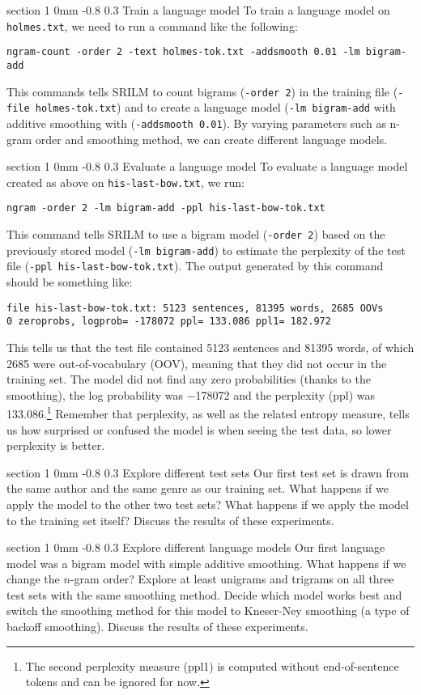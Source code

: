 \documentclass[11pt]{article}
\makeatletter
\newcommand{\newsec}[2]{\section{#1}\label{sec:#2}\noindent}
\renewcommand{\section}{\@startsection
{section}%
{1}%
{0mm}%
{-0.8\baselineskip}%
{0.3\baselineskip}%
{\bfseries\large}}%
\makeatother
\begin{document}
\newsec{Train a language model}{train}%
To train a language model on {\tt holmes.txt}, we need to run a command like the following:
\begin{verbatim}
ngram-count -order 2 -text holmes-tok.txt -addsmooth 0.01 -lm bigram-add
\end{verbatim}
This commands tells SRILM to count bigrams ({\tt -order\,2}) in the training file ({\tt -file\,holmes-tok.txt})
and to create a language model ({\tt -lm\,bigram-add} with additive smoothing with ({\tt -addsmooth\,0.01}).
By varying parameters such as n-gram order and smoothing method, we can create different language models.

\newsec{Evaluate a language model}{eval}%
To evaluate a language model created as above on {\tt his-last-bow.txt}, we run:
\begin{verbatim}
ngram -order 2 -lm bigram-add -ppl his-last-bow-tok.txt
\end{verbatim}
This command tells SRILM to use a bigram model ({\tt -order\,2}) based on the previously stored model ({\tt -lm\,bigram-add}) 
to estimate the perplexity of the test file ({\tt -ppl\,his-last-bow-tok.txt}). The output generated by this command should be
something like:
\begin{verbatim}
file his-last-bow-tok.txt: 5123 sentences, 81395 words, 2685 OOVs
0 zeroprobs, logprob= -178072 ppl= 133.086 ppl1= 182.972
\end{verbatim}
This tells us that the test file contained 5123 sentences and 81395 words, of which 2685 were out-of-vocabulary (OOV),
meaning that they did not occur in the training set. The model did not find any zero probabilities (thanks to the smoothing),
the log probability was $-$178072 and the perplexity (ppl) was 133.086.\footnote{The second perplexity measure (ppl1)
is computed without end-of-sentence tokens and can be ignored for now.} Remember that perplexity, as well as the related
entropy measure, tells us how surprised or confused the model is when seeing the test data, so lower perplexity is better.

\newsec{Explore different test sets}{sets}%
Our first test set is drawn from the same author and the same genre as our training set. What happens if we apply the model
to the other two test sets? What happens if we apply the model to the training set itself? Discuss the results of these experiments.

\newsec{Explore different language models}{models}%
Our first language model was a bigram model with simple additive smoothing. What happens if we change the $n$-gram order?
Explore at least unigrams and trigrams on all three test sets with the same smoothing method. Decide which model works
best and switch the smoothing method for this model to Kneser-Ney smoothing (a type of backoff smoothing). Discuss the results of 
these experiments.
\end{document}
